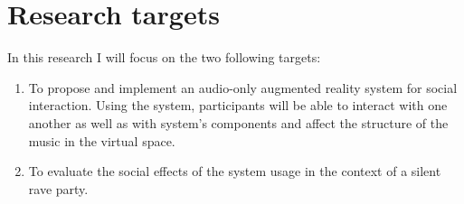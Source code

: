 \section{Research targets}

In this research I will focus on the two following targets:
\begin{enumerate}
	\item To propose and implement an audio-only augmented reality system for social interaction.
	Using the system, participants will be able to interact with one another as well as with system's components and affect the structure of the music in the virtual space.
	\item To evaluate the social effects of the system usage in the context of a silent rave party.
\end{enumerate}